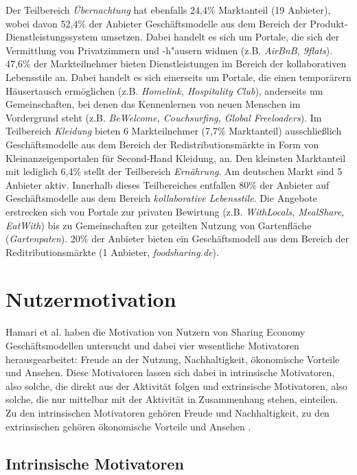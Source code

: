 \documentclass[a4paper]{scrartcl}
\begin{document}
\begin{multicols}{2}
			\noindent
			Der Teilbereich \textit{\"Ubernachtung} hat ebenfalls 24,4\% Marktanteil (19 Anbieter), wobei davon 52,4\% der Anbieter Geschäftsmodelle aus dem Bereich der Produkt-Dienstleistungssystem umsetzen. Dabei handelt es sich um Portale, die sich der Vermittlung von Privatzimmern und -h"ausern widmen (z.B. \textit{AirBnB, 9flats}). 47,6\% der Markteilnehmer bieten Dienstleistungen im Bereich der kollaborativen Lebensstile an. Dabei handelt es sich einerseits um Portale, die einen tempor\"arern H\"ausertausch erm\"oglichen (z.B. \textit{Homelink, Hospitality Club}), anderseits um Gemeinschaften, bei denen das Kennenlernen von neuen Menschen im Vordergrund steht (z.B. \textit{BeWelcome, Couchsurfing, Global Freeloaders}). \newline
			\noindent
			Im Teilbereich \textit{Kleidung} bieten 6 Markteilnehmer (7,7\% Marktanteil) ausschlie\ss lich Gesch\"aftsmodelle aus dem Bereich der Redistributionsm\"arkte in Form von Kleinanzeigenportalen f\"ur Second-Hand Kleidung, an.\newline
			\noindent
			Den kleinsten Marktanteil mit lediglich 6,4\% stellt der Teilbereich \textit{Ern\"ahrung}. Am deutschen Markt sind 5 Anbieter aktiv. Innerhalb dieses Teilbereiches entfallen 80\% der Anbieter auf Gesch\"aftsmodelle aus dem Bereich \textit{kollaborative Lebensstile}. Die Angebote erstrecken sich von Portale zur privaten Bewirtung (z.B. \textit{WithLocals, MealShare, EatWith}) bis zu Gemeinschaften zur geteilten Nutzung von Gartenfl\"ache (\textit{Gartenpaten}).  20\% der Anbieter bieten ein Geschäftsmodell aus dem Bereich der Reditributionsm\"arkte (1 Anbieter, \textit{foodsharing.de}).
		
	
	\section{Nutzermotivation}
		Hamari et al. haben die Motivation von Nutzern von Sharing Economy Gesch\"aftsmodellen untersucht und dabei vier wesentliche Motivatoren herausgearbeitet: Freude an der Nutzung, Nachhaltigkeit, \"okonomische Vorteile und Ansehen. Diese Motivatoren lassen sich dabei in intrinsische Motivatoren, also solche, die direkt aus der Aktivit\"at folgen und extrinsische Motivatoren, also solche, die nur mittelbar mit der Aktivit\"at in Zusammenhang stehen, einteilen. Zu den intrinsischen Motivatoren geh\"oren Freude und Nachhaltigkeit, zu den extrinsischen geh\"oren \"okonomische Vorteile und Ansehen \cite{doi:10.1002/asi.23552}.
		
	
		\subsection{Intrinsische Motivatoren}
		

\end{multicols}
\end{document}
